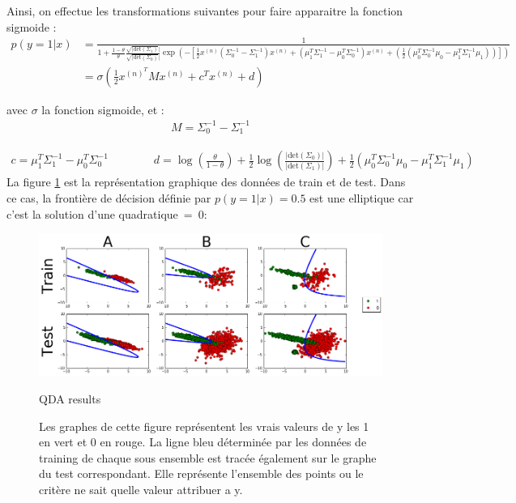 \documentclass{article}
\begin{document}
\begin{enumerate}
\begin{enumerate}
Ainsi, on effectue les transformations suivantes pour faire apparaitre la fonction sigmoide : 
\begin{align*} 
p(y=1|x)&=\frac{1}{1+\frac{1-\theta}{\theta}\frac{\sqrt{|\textrm{det}(\Sigma_1)}|}{\sqrt{|\textrm{det}(\Sigma_0)}|}\exp(-[\frac{1}{2}x^{(n)}(\Sigma_0^{-1}-\Sigma_1^{-1})x^{(n)}+(\mu_1^{T}\Sigma_1^{-1}-\mu_0^{T}\Sigma_0^{-1})x^{(n)}+(\frac{1}{2}(\mu_0^{T}\Sigma_0^{-1}\mu_0-\mu_1^{T}\Sigma_1^{-1}\mu_1))])}
\\&= \sigma(\frac{1}{2}x^{(n)}^TMx^{(n)}+c^Tx^{(n)}+d)
\end{align*}

avec $\sigma$ la fonction sigmoide, et :
\begin{align*} 
M=\Sigma_0^{-1}-\Sigma_1^{-1}
\end{align*}

\begin{align*} 
c=\mu_1^{T}\Sigma_1^{-1}-\mu_0^{T}\Sigma_0^{-1} \qquad \qquad d=\log(\frac{\theta}{1-\theta})+\frac{1}{2}\log(\frac{|\textrm{det}(\Sigma_0)|}{|\textrm{det}(\Sigma_1)|})+ \frac{1}{2}(\mu_0^{T}\Sigma_0^{-1}\mu_0-\mu_1^{T}\Sigma_1^{-1}\mu_1)
\end{align*}
La figure \ref{fig:QDA} est la représentation graphique des données de train et de test. Dans ce cas, la frontière de décision définie par $p(y=1|x)=0.5$ est une elliptique car c'est la solution d'une quadratique~=~0:
\begin{figure}[h!]
    \includegraphics[scale=0.45]{QDA}
    \caption{QDA results}
    \caption*{Les graphes de cette figure représentent les vrais valeurs de y les 1 en vert et 0 en rouge. La ligne bleu déterminée par les données de training de chaque sous ensemble est tracée également sur le graphe du test correspondant. Elle représente l'ensemble des points ou le critère ne sait quelle valeur attribuer a y.\label{fig:QDA}}
\end{figure}


\end{enumerate}
\end{enumerate}
\end{document}
